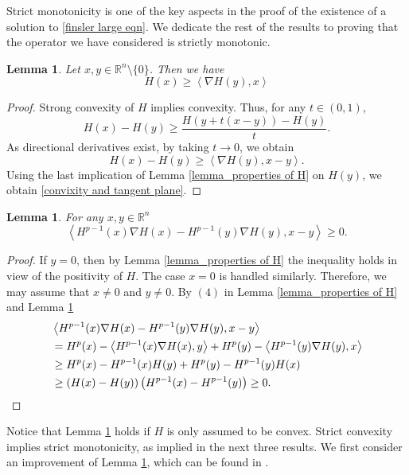 \documentclass[11pt]{amsart}
\newtheorem{lemma}[theorem]{Lemma}
\newcommand{\rn}{\mathbb{R}^{n}}
\newcommand{\D}{\nabla}
\newcommand{\fin}[1]{H^{p-1}( #1)\nabla H( #1)}
\numberwithin{equation}{section}
\begin{document}
Strict monotonicity is one of the key aspects in the proof of the existence of a solution to \eqref{finsler large eqn}. We dedicate the rest of the results to proving that the operator we have considered is strictly monotonic.
\begin{lemma}\label{euler inequality}
    Let $x,y\in \rn\setminus\{0\}$. Then we have 
    \begin{equation}\label{convixity and tangent plane}
        H(x)\geq \left<\D H(y), x\right>
    \end{equation}
\end{lemma}
\begin{proof}
     Strong convexity of $H$ implies convexity. Thus, for any $t\in (0,1)$,
    \begin{equation*}
        H(x)-H(y)\geq \frac{H(y+t(x-y))-H(y)}{t}.
    \end{equation*}
       As directional derivatives exist, by taking $t\to 0$, we obtain  
     \begin{equation}\label{eqn hyperplane}
         H(x)-H(y)\geq \left<\D H(y), x-y\right>.
     \end{equation}
     Using the last implication of Lemma \ref{lemma_properties of H} on $H(y)$, we obtain  \eqref{convixity and tangent plane}.
\end{proof}
\begin{lemma}\label{lemma monotone operator}
    For any $x,y \in \rn$
    \begin{equation*}
        \left< \fin{x}-\fin{y}, x-y\right>\geq 0.
    \end{equation*}
\end{lemma}
\begin{proof}
    If $y=0$, then by Lemma \ref{lemma_properties of H} the inequality holds in view of the positivity of $H$. The case $x=0$ is handled similarly. Therefore, we may assume that $x\neq 0$ and $y\neq 0$. By $(4)$ in Lemma \ref{lemma_properties of H} and Lemma \ref{euler inequality} 
\begin{align*}
    &\left<\fin{x}-\fin{y}, x-y\right>\\
    &= H^{p}(x)-\left<\fin{x},  y\right>
    +H^{p}(y)-\left<\fin{y}, x\right>\\
    &\geq H^{p}(x)-H^{p-1}(x) H(y)
    +H^{p}(y)-H^{p-1}(y) H(x)\\
    &\geq \left(H(x)-H(y)\right)\left(H^{p-1}(x)-H^{p-1}(y)\right)\geq 0. \qedhere
\end{align*}
 \end{proof}
 Notice that Lemma \ref{lemma monotone operator} holds if $H$ is only assumed to be convex. Strict convexity implies strict monotonicity, as implied in the next three results. We first consider an improvement of Lemma \ref{euler inequality}, which can be found in \cite[Proposition 4.6]{Ohta2009}.
\end{document}
